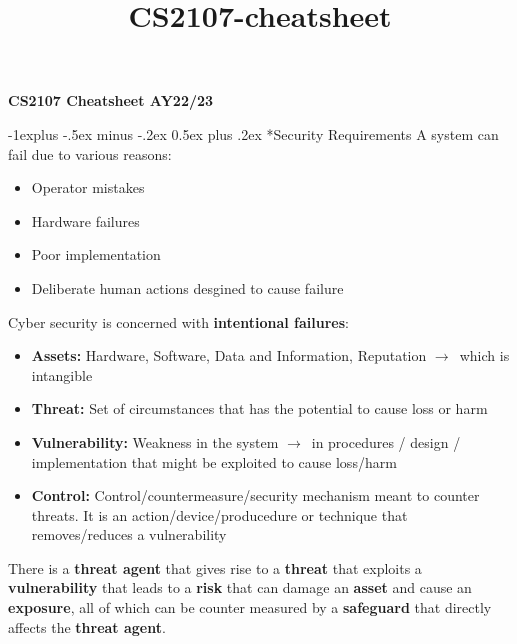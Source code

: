 \documentclass[10pt,landscape]{article}
\title{CS2107-cheatsheet}
\makeatletter
\renewcommand{\subsection}{\@startsection{subsection}{2}{0mm}%
                                {-1explus -.5ex minus -.2ex}%
                                {0.5ex plus .2ex}%
                                {\normalfont\normalsize\bfseries}}
\makeatother
\begin{document}
\raggedright
\footnotesize

\begin{tiny}
     \small{\textbf{CS2107 Cheatsheet AY22/23}} \\
\end{tiny}
\begin{multicols*}{3}
\setlength{\premulticols}{1pt}
\setlength{\postmulticols}{1pt}
\setlength{\multicolsep}{1pt}
\setlength{\columnsep}{2pt}

\subsection*{Security Requirements}
A system can fail due to various reasons:
\begin{itemize}
    \item Operator mistakes
    \item Hardware failures
    \item Poor implementation
    \item Deliberate human actions desgined to cause failure
\end{itemize}
Cyber security is concerned with \textbf{intentional failures}:
\begin{itemize}
    \item \textbf{Assets:} Hardware, Software, Data and Information, Reputation $\rightarrow$\ which is intangible
    \item \textbf{Threat:} Set of circumstances that has the potential to cause loss or harm
    \item \textbf{Vulnerability:} Weakness in the system $\rightarrow$\ in procedures / design / implementation that might be exploited to cause loss/harm
    \item \textbf{Control:} Control/countermeasure/security mechanism meant to counter threats. It is an action/device/producedure or technique that removes/reduces a vulnerability
\end{itemize}

There is a \textbf{threat agent} that gives rise to a \textbf{threat} that exploits a \textbf{vulnerability} that leads to a \textbf{risk} that can damage an \textbf{asset} and cause an \textbf{exposure}, all of which can be counter measured by a \textbf{safeguard} that directly affects the \textbf{threat agent}.


\end{multicols*}
\end{document}
